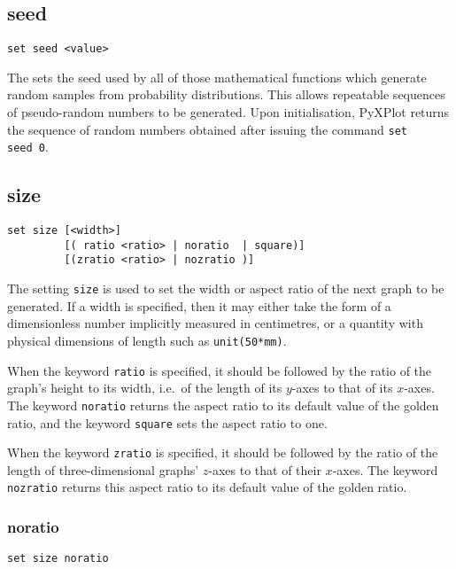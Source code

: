 \subsection{seed}

\begin{verbatim}
set seed <value>
\end{verbatim}

The  sets the seed used by all of those mathematical
functions which generate random samples from probability distributions.  This
allows repeatable sequences of pseudo-random numbers to be generated.  Upon
initialisation, PyXPlot returns the sequence of random numbers obtained after
issuing the command {\tt set seed~0}.


\subsection{size}

\begin{verbatim}
set size [<width>]
         [( ratio <ratio> | noratio  | square)]
         [(zratio <ratio> | nozratio )]
\end{verbatim}

The setting {\tt size} is used to set the width or aspect ratio of the next
graph to be generated. If a width is specified, then it may either take the
form of a dimensionless number implicitly measured in centimetres, or a
quantity with physical dimensions of length such as {\tt unit(50*mm)}.

When the keyword {\tt ratio} is specified, it should be followed by the ratio
of the graph's height to its width, i.e.\ of the length of its $y$-axes to that
of its $x$-axes. The keyword {\tt noratio} returns the aspect ratio to its
default value of the golden ratio, and the keyword {\tt square} sets the aspect
ratio to one.

When the keyword {\tt zratio} is specified, it should be followed by the ratio
of the length of three-dimensional graphs' $z$-axes to that of their $x$-axes.
The keyword {\tt nozratio} returns this aspect ratio to its default value of
the golden ratio.


\subsubsection{noratio}

\begin{verbatim}
set size noratio
\end{verbatim}

